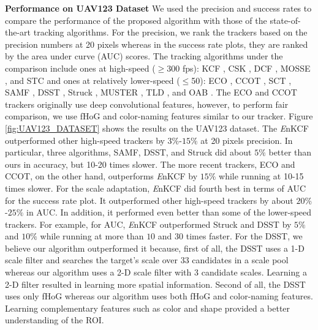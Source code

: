 \documentclass[10pt,twocolumn,letterpaper]{article}
\begin{document}
\textbf{Performance on UAV123 Dataset} We used the precision and
success rates to compare the performance of the proposed algorithm
with those of the state-of-the-art tracking algorithms. For the
precision, we rank the trackers based on the precision numbers at 20
pixels whereas in the success rate plots, they are ranked by the area
under curve (AUC) scores. The tracking algorithms under the comparison
include ones at high-speed ($\geq$300 fps): KCF
\cite{henriques2015high}, CSK \cite{henriques2012exploiting}, DCF
\cite{henriques2015high}, MOSSE \cite{bolme2010visual}, and STC
\cite{zhang2014fast} and ones at relatively lower-speed ($\leq$50):
ECO \cite{DanelljanCVPR2017}, CCOT \cite{DanelljanECCV2016}, SCT
\cite{Choi_2016_CVPR}, SAMF \cite{li2014scale}, DSST
\cite{danelljan2014accurate}, Struck \cite{hare2012efficient}, MUSTER
\cite{hong2015multi}, TLD \cite{kalal2012tracking}, and OAB
\cite{zhang2012robust}. The ECO and CCOT trackers originally use deep
convolutional features, however, to perform fair comparison, we use
fHoG and color-naming features similar to our tracker. Figure
\ref{fig:UAV123_DATASET} shows the results on the UAV123 dataset. The
    {\it E}nKCF outperformed other high-speed trackers by $3\%$-$15\%$
    at 20 pixels precision. In particular, three algorithms, SAMF,
    DSST, and Struck did about $5\%$ better than ours in accuracy, but
    10-20 times slower. The more recent trackers, ECO and CCOT, on the
    other hand, outperforms {\it E}nKCF by $15\%$ while running at
    10-15 times slower. For the scale adaptation, {\it E}nKCF did
    fourth best in terms of AUC for the success rate plot. It
    outperformed other high-speed trackers by about $20\%$-$25\%$ in
    AUC. In addition, it performed even better than some of the
    lower-speed trackers.  For example, for AUC, {\it E}nKCF
    outperformed Struck and DSST by $5\%$ and $10\%$ while running at
    more than $10$ and $30$ times faster. For the DSST, we believe our
    algorithm outperformed it because, first of all, the DSST uses a
    1-D scale filter and searches the target's scale over 33
    candidates in a scale pool whereas our algorithm uses a 2-D scale
    filter with 3 candidate scales. Learning a 2-D filter resulted in
    learning more spatial information. Second of all, the DSST uses
    only fHoG whereas our algorithm uses both fHoG and color-naming
    features. Learning complementary features such as color and shape
    provided a better understanding of the ROI.
    
\end{document}
